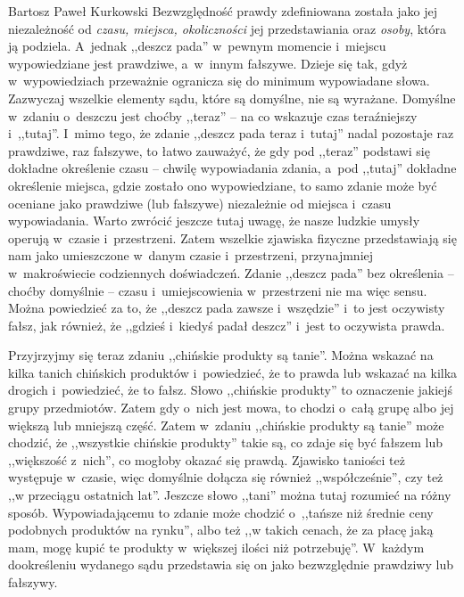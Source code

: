 \begin{artplenv}{Bartosz Paweł Kurkowski}
Bezwzględność prawdy zdefiniowana została jako jej niezależność od \textit{czasu, miejsca, okoliczności} jej
przedstawiania oraz \textit{osoby}, która ją podziela. A~jednak ,,deszcz pada'' w~pewnym momencie i~miejscu wypowiedziane
jest prawdziwe, a~w~innym fałszywe. Dzieje się tak, gdyż w~wypowiedziach przeważnie ogranicza się do minimum
wypowiadane słowa. Zazwyczaj wszelkie elementy sądu, które są domyślne, nie są wyrażane. Domyślne w~zdaniu o~deszczu
jest choćby ,,teraz'' -- na co wskazuje czas teraźniejszy i~,,tutaj''. I~mimo tego, że zdanie ,,deszcz pada teraz i~tutaj''
nadal pozostaje raz prawdziwe, raz fałszywe, to łatwo zauważyć, że gdy pod ,,teraz'' podstawi się dokładne określenie
czasu -- chwilę wypowiadania zdania, a~pod ,,tutaj'' dokładne określenie miejsca, gdzie zostało ono wypowiedziane, to samo
zdanie może być oceniane jako prawdziwe (lub fałszywe) niezależnie od miejsca i~czasu wypowiadania. Warto zwrócić
jeszcze tutaj uwagę, że nasze ludzkie umysły operują w~czasie i~przestrzeni. Zatem wszelkie zjawiska fizyczne
przedstawiają się nam jako umieszczone w~danym czasie i~przestrzeni, przynajmniej w~makroświecie codziennych
doświadczeń. Zdanie ,,deszcz pada'' bez określenia -- choćby domyślnie -- czasu i~umiejscowienia w~przestrzeni nie ma więc
sensu. Można powiedzieć za to, że ,,deszcz pada zawsze i~wszędzie'' i~to jest oczywisty fałsz, jak również, że ,,gdzieś
i~kiedyś padał deszcz'' i~jest to oczywista prawda.


Przyjrzyjmy się teraz zdaniu ,,chińskie produkty są tanie''. Można wskazać na kilka tanich chińskich
produktów i~powiedzieć, że to prawda lub wskazać na kilka drogich i~powiedzieć, że to fałsz. Słowo ,,chińskie produkty'' to
oznaczenie jakiejś grupy przedmiotów. Zatem gdy o~nich jest mowa, to chodzi o~całą grupę albo jej większą lub mniejszą
część. Zatem w~zdaniu ,,chińskie produkty są tanie'' może chodzić, że ,,wszystkie chińskie produkty'' takie są, co zdaje
się być fałszem lub ,,większość z~nich'', co mogłoby okazać się prawdą. Zjawisko taniości też występuje w~czasie, więc
domyślnie dołącza się również ,,współcześnie'', czy też ,,w przeciągu ostatnich lat''. Jeszcze słowo ,,tani'' można tutaj
rozumieć na różny sposób. Wypowiadającemu to zdanie może chodzić o~,,tańsze niż średnie ceny podobnych produktów na
rynku'', albo też ,,w takich cenach, że za płacę jaką mam, mogę kupić te produkty w~większej ilości niż potrzebuję''.
W~każdym dookreśleniu wydanego sądu przedstawia się on jako bezwzględnie prawdziwy lub fałszywy.



\end{artplenv}
